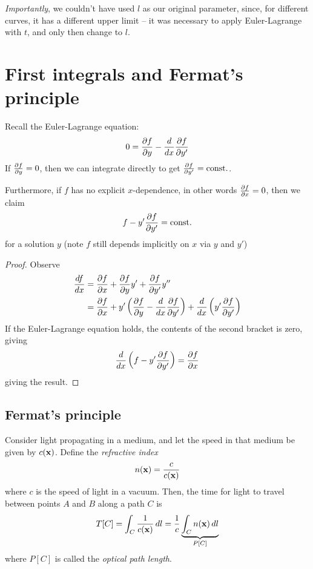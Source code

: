 \documentclass{../template/note}
\begin{document}
\begin{enumerate}[label=\protect\circled{\arabic*}]
        \emph{Importantly}, we couldn't have used $l$ as our original parameter, since, for different curves, it has a different upper limit -- it was necessary to apply Euler-Lagrange with $t$, and only then change to $l$.
    \end{enumerate}
    
    \section{First integrals and Fermat's principle}

    Recall the Euler-Lagrange equation:
    \begin{align*}
        0 = \pd{f}{y} - \frac{d}{dx} \pd{f}{y'}
    \end{align*}
    If $\pd{f}{y} = 0$, then we can integrate directly to get $\pd{f}{y'} = \text{const.}$.
    
    \begin{lemma}
        Furthermore, if $f$ has no explicit $x$-dependence, in other words $\pd{f}{x} = 0$, then we claim
        \begin{align*}
            f - y'\pd{f}{y'} = \text{const.}
        \end{align*}
        for a solution $y$ (note $f$ still depends implicitly on $x$ via $y$ and $y'$)        
    \end{lemma}
    
    \begin{proof}
        Observe
        \begin{align*}
            \frac{df}{dx} &= \pd{f}{x} + \pd{f}{y}y' + \pd{f}{y'}y'' \\
            &= \pd{f}{x} + y' \left(\pd{f}{y} - \frac{d}{dx} \pd{f}{y'}\right) + \frac{d}{dx} \left(y' \pd{f}{y'}\right)
        \end{align*}
        If the Euler-Lagrange equation holds, the contents of the second bracket is zero, giving
        \begin{align*}
            \frac{d}{dx}\left(f-y'\pd{f}{y'}\right) = \pd{f}{x}
        \end{align*}
        giving the result.       
    \end{proof}
    
    \subsection{Fermat's principle}

    Consider light propagating in a medium, and let the speed in that medium be given by $c(\V x)$. Define the \emph{refractive index}
    \begin{align*}
        n(\V x) = \frac c {c(\V x)}
    \end{align*}
    where $c$ is the speed of light in a vacuum. Then, the time for light to travel between points $A$ and $B$ along a path $C$ is
    \begin{align*}
        T[C] = \int_C \frac{1}{c(\V x)} \D l = \frac{1}{c} \underbrace{\int_C n(\V x) \D l}_{P[C]}
    \end{align*}
    where $P[C]$ is called the \emph{optical path length}.
\end{document}
